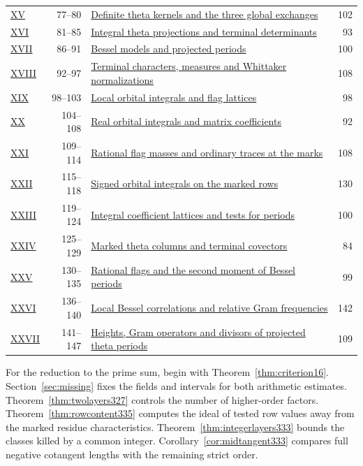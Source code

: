 \documentclass[a4paper,11pt]{article}
\theoremstyle{definition}
\theoremstyle{remark}
\numberwithin{equation}{section}
\begin{document}
\begin{longtable}{@{}l r p{.63\linewidth} r@{}}
\hyperref[nav:volume-XV]{XV} & 77--80 & \hyperref[nav:volume-XV]{Definite theta kernels and the three global exchanges} & 102 \\
\hyperref[nav:volume-XVI]{XVI} & 81--85 & \hyperref[nav:volume-XVI]{Integral theta projections and terminal determinants} & 93 \\
\hyperref[nav:volume-XVII]{XVII} & 86--91 & \hyperref[nav:volume-XVII]{Bessel models and projected periods} & 100 \\
\hyperref[nav:volume-XVIII]{XVIII} & 92--97 & \hyperref[nav:volume-XVIII]{Terminal characters, measures and Whittaker normalizations} & 108 \\
\hyperref[nav:volume-XIX]{XIX} & 98--103 & \hyperref[nav:volume-XIX]{Local orbital integrals and flag lattices} & 98 \\
\hyperref[nav:volume-XX]{XX} & 104--108 & \hyperref[nav:volume-XX]{Real orbital integrals and matrix coefficients} & 92 \\
\hyperref[nav:volume-XXI]{XXI} & 109--114 & \hyperref[nav:volume-XXI]{Rational flag masses and ordinary traces at the marks} & 108 \\
\hyperref[nav:volume-XXII]{XXII} & 115--118 & \hyperref[nav:volume-XXII]{Signed orbital integrals on the marked rows} & 130 \\
\hyperref[nav:volume-XXIII]{XXIII} & 119--124 & \hyperref[nav:volume-XXIII]{Integral coefficient lattices and tests for periods} & 100 \\
\hyperref[nav:volume-XXIV]{XXIV} & 125--129 & \hyperref[nav:volume-XXIV]{Marked theta columns and terminal covectors} & 84 \\
\hyperref[nav:volume-XXV]{XXV} & 130--135 & \hyperref[nav:volume-XXV]{Rational flags and the second moment of Bessel periods} & 99 \\
\hyperref[nav:volume-XXVI]{XXVI} & 136--140 & \hyperref[nav:volume-XXVI]{Local Bessel correlations and relative Gram frequencies} & 142 \\
\hyperref[nav:volume-XXVII]{XXVII} & 141--147 & \hyperref[nav:volume-XXVII]{Heights, Gram operators and divisors of projected theta periods} & 109 \\
\end{longtable}\endgroup
\par\medskip
For the reduction to the prime sum, begin with Theorem~\ref{thm:criterion16}.
Section~\ref{sec:missing} fixes the fields and intervals for both arithmetic estimates.
Theorem~\ref{thm:twolayers327} controls the number of higher-order factors.
Theorem~\ref{thm:rowcontent335} computes the ideal of tested row values away from the marked residue characteristics. Theorem~\ref{thm:integerlayers333} bounds the classes killed by a common integer. Corollary~\ref{cor:midtangent333} compares full negative cotangent lengths with the remaining strict order.
\end{document}
